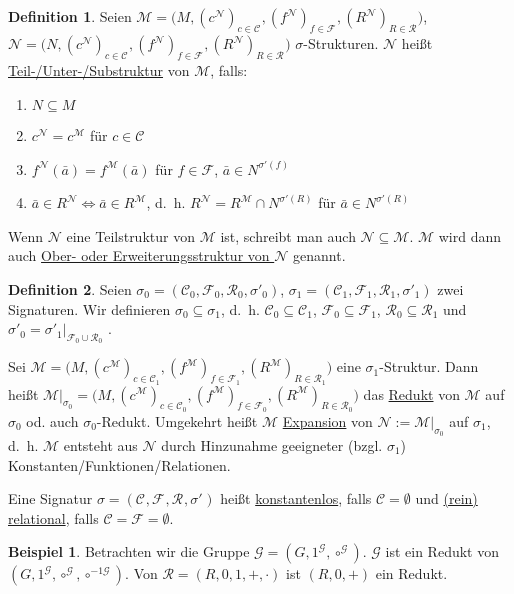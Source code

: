 \documentclass{article}
\theoremstyle{definition}
\newtheorem{dfn}{Definition}[section]
\newtheorem*{bsp}{Beispiel}
\theoremstyle{plain}
\newcommand{\m}[1]{\mathcal{#1}}
\newcommand{\sign}[1]{(\m{C}_{#1}, \m{F}_{#1}, \m{R}_{#1}, \sigma'_{#1})}
\newcommand{\struc}[3]{\big(#1, (c^{#2})_{c \in \m{C}_{#3}}, (f^{#2})_{f \in \m{F}_{#3}}, (R^{#2})_{R \in \m{R}_{#3}}\big)}
\begin{document}
    \begin{dfn}
        Seien $ \m{M} = \struc{M}{\m{N}}{} $, $ \m{N} = \struc{N}{\m{N}}{} $ $\sigma $-Strukturen.
        $ \m{N} $ heißt \underline{Teil-/Unter-/Substruktur} von $ \m{M} $, falls:
        \begin{enumerate}
            \item $ N \subseteq M $
            \item $ c^\m{N} = c^\m{M} $ für $ c \in \m{C} $
            \item $ f^\m{N}(\bar{a}) = f^\m{M}(\bar{a}) $ für $ f \in \m{F} $, $ \bar{a} \in N^{\sigma'(f)} $
            \item $ \bar{a} \in R^\m{N} \Leftrightarrow \bar{a} \in R^\m{M} $, d.~h. $ R^\m{N} = R^\m{M} \cap N^{\sigma'(R)} $ für $ \bar{a} \in N^{\sigma'(R)} $
        \end{enumerate}

            Wenn $ \m{N} $ eine Teilstruktur von $ \m{M} $ ist, schreibt man auch $ \m{N} \subseteq \m{M} $.
            $ \m{M} $ wird dann auch \underline{Ober- oder Erweiterungsstruktur von $ \m{N} $} genannt.
    \end{dfn}

    \begin{dfn}
        Seien $ \sigma_0 = \sign{0} $, $ \sigma_1 = \sign{1} $ zwei Signaturen.
        Wir definieren $ \sigma_0 \subseteq \sigma_1 $, d.~h. $ \m{C}_0 \subseteq \m{C}_1 $, $ \m{F}_0 \subseteq \m{F}_1 $, $ \m{R}_0 \subseteq \m{R}_1 $ und $ \sigma'_0 = \sigma'_1 \vert_{\m{F}_0 \cup \m{R}_0} $ .

        Sei $ \m{M} = \struc{M}{\m{M}}{1} $ eine $ \sigma_1 $-Struktur.
        Dann heißt $ \m{M} \vert_{\sigma_0} = \struc{M}{\m{M}}{0} $ das \underline{Redukt} von $ \m{M} $ auf $ \sigma_0 $ od. auch $ \sigma_0 $-Redukt.
        Umgekehrt heißt $ \m{M} $ \underline{Expansion} von $ \m{N} := \m{M} \vert_{\sigma_0} $ auf $ \sigma_1 $, d.~h. $ \m{M} $ entsteht aus $ \m{N} $ durch Hinzunahme geeigneter (bzgl. $ \sigma_1 $) Konstanten/Funktionen/Relationen.

        Eine Signatur $ \sigma = \sign{} $ heißt \underline{konstantenlos}, falls $ \m{C} = \emptyset $ und \underline{(rein) relational}, falls $ \m{C} = \m{F} = \emptyset $.
    \end{dfn}

    \begin{bsp}
        Betrachten wir die Gruppe $ \m{G} = (G, 1^\m{G}, \circ^\m{G}) $.
        $ \m{G} $ ist ein Redukt von $ (G, 1^\m{G}, \circ^\m{G}, \circ^{-1\m{G}}) $.
        Von $ \m{R} = (R, 0, 1, +, \cdot) $ ist $ (R, 0, +) $ ein Redukt.
    \end{bsp}
\end{document}
